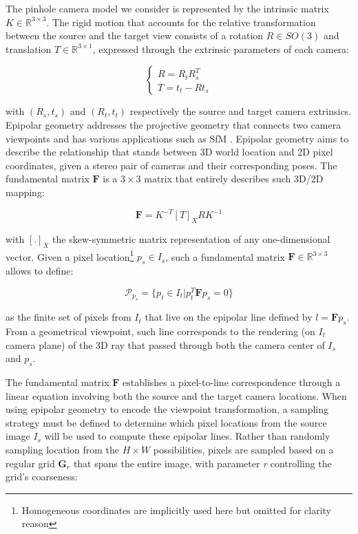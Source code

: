 The pinhole camera model we consider is represented by the intrinsic matrix $K \in \mathbb{R}^{3\times3}$. The rigid motion that accounts for the relative transformation between the source and the target view consists of a rotation $R \in SO(3)$ and translation $T\in \mathbb{R}^{3\times1}$, expressed through the extrinsic parameters of each camera:

\begin{equation}
     \begin{cases}
     R = R_{t} R_{s}^{T} \\
     T = t_{t} - R t_{s}
     \end{cases}
\end{equation}

with $(R_{s},t_{s})$ and $(R_{t},t_{t})$ respectively the source and target camera extrinsics. Epipolar geometry \citep{hartley2003multiple} addresses the projective geometry that connects two camera viewpoints and has various applications such as \ac{SfM} \citep{tamaazousti2011nonlinear}. Epipolar geometry aims to describe the relationship that stands between 3D world location and 2D pixel coordinates, given a stereo pair of cameras and their corresponding poses. The fundamental matrix $\mathbf{F}$ is a $3\times3$ matrix that entirely describes such 3D/2D mapping: 

\begin{equation}
    \mathbf{F} = K^{-T} [T]_{X} R  K^{-1}
\end{equation}

with $[.]_{X}$ the skew-symmetric matrix representation of any one-dimensional vector. Given a pixel location\footnote{Homogeneous coordinates are implicitly used here but omitted for clarity reason} $p_{s}\in I_{s}$, such a fundamental matrix $\mathbf{F} \in \mathbb{R}^{3\times3}$ allows to define: 

\begin{equation}
    \mathcal{P}_{p_{s}} = \{p_{t}\in I_{t} | p_{t}^{T}\mathbf{F}p_{s} = 0 \}
\end{equation}

as the finite set of pixels from $I_{t}$ that live on the epipolar line defined by $l=\mathbf{F}p_{s}$. From a geometrical viewpoint, such line corresponds to the rendering (on $I_{t}$ camera plane) of the 3D ray that passed through both the camera center of $I_{s}$ and $p_{s}$. 

The fundamental matrix $\mathbf{F}$ establishes a pixel-to-line correspondence through a linear equation involving both the source and the target camera locations. When using epipolar geometry to encode the viewpoint transformation, a sampling strategy must be defined to determine which pixel locations from the source image $I_{s}$ will be used to compute these epipolar lines. Rather than randomly sampling location from the $H\times W$ possibilities, pixels are sampled based on a regular grid $\textbf{G}_{r}$ that spans the entire image, with parameter \textit{r} controlling the grid’s coarseness: 

